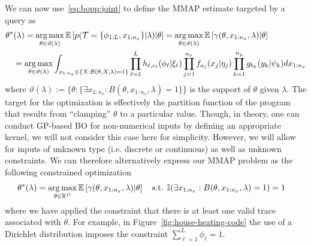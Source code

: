 We can now use~\eqref{eq:bopp:joint} to define the MMAP estimate targeted by a  query as
\begin{align}
\label{eq:bopp:mmap}
\begin{split}
\theta^*& (\lambda) = \operatorname*{arg\,max}_{\theta \in \vartheta (\lambda)} 
\mathbb{E} \left[p(\mathcal{T} = \{\phi_{1:L},x_{1:n_x}\} | \lambda) \middle| \theta \right]
= \operatorname*{arg\,max}_{\theta \in \vartheta (\lambda)} 
\mathbb{E} \left[\gamma(\theta,x_{1:n_x}, \lambda) \middle| \theta \right] \\
& = \operatorname*{arg\,max}_{\theta \in \vartheta (\lambda)} 
\int_{x_{1:n_x} \in \{X : \mathcal{B}(\theta,X,\lambda)=1\}} 
\prod_{\ell=1}^{L} h_{\ell,c_{\ell}} (\phi_{\ell} | \xi_{\ell})
\prod_{j=1}^{n_x} f_{a_j}(x_j | \eta_j) \prod_{k=1}^{n_y} g_{b_k}(y_k | \psi_k) dx_{1:n_x}
\end{split}
\end{align}
where $\vartheta (\lambda) := \{\theta : \{\exists x_{1:n_x} : B(\theta,x_{1:n_x},\lambda)=1\}\}$
is the support of $\theta$ given $\lambda$.  The target for the optimization is
effectively the partition function of the program that results from ``clamping'' $\theta$ to a particular
value.  Though, in theory, one can conduct GP-based BO for non-numerical inputs by defining
an appropriate kernel, we will not consider this case here for simplicity.  However, we will allow for
inputs of unknown type (i.e. discrete or continuous) as well as unknown constraints.  We can
therefore alternatively express our MMAP problem as the following constrained optimization
\begin{align}
\label{eq:bopp:mmapconstr}
\begin{split}
&\theta^* (\lambda) 
= \operatorname*{arg\,max}_{\theta \in \mathbb{R}^D} 
\mathbb{E} \left[\gamma(\theta,x_{1:n_x}, \lambda) \middle| \theta \right] \quad \text{s.t.} \: \: \mathbb{I}(\exists x_{1:n_x} : B(\theta,x_{1:n_x},\lambda)=1) = 1
\end{split}
\end{align}
where we have applied the constraint that there is at least one valid trace associated with $\theta$.
For example, in Figure~\ref{fig:house-heating-code} the use of a Dirichlet distribution imposes
the constraint $\sum_{\ell=1}^{L} \phi_{\ell} = 1$.

